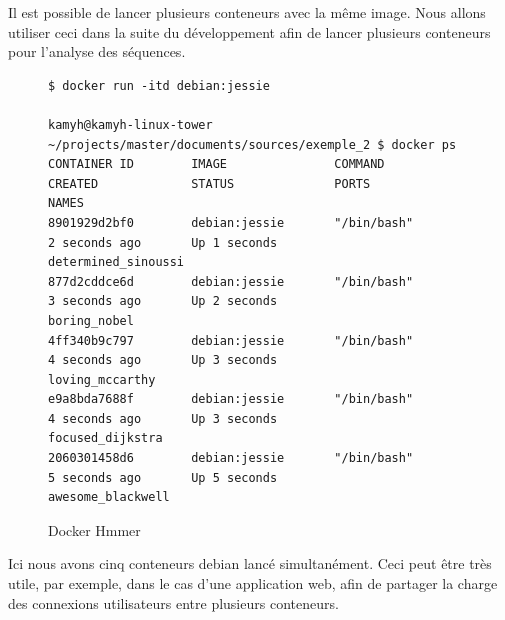 Il est possible de lancer plusieurs conteneurs avec la même image. Nous allons utiliser ceci dans la suite du développement afin de lancer plusieurs conteneurs pour l'analyse des séquences.

\begin{figure}[H] 
\centering 
\begin{lstlisting}[frame=single]
$ docker run -itd debian:jessie

kamyh@kamyh-linux-tower ~/projects/master/documents/sources/exemple_2 $ docker ps
CONTAINER ID        IMAGE               COMMAND             CREATED             STATUS              PORTS               NAMES
8901929d2bf0        debian:jessie       "/bin/bash"         2 seconds ago       Up 1 seconds                            determined_sinoussi
877d2cddce6d        debian:jessie       "/bin/bash"         3 seconds ago       Up 2 seconds                            boring_nobel
4ff340b9c797        debian:jessie       "/bin/bash"         4 seconds ago       Up 3 seconds                            loving_mccarthy
e9a8bda7688f        debian:jessie       "/bin/bash"         4 seconds ago       Up 3 seconds                            focused_dijkstra
2060301458d6        debian:jessie       "/bin/bash"         5 seconds ago       Up 5 seconds                            awesome_blackwell
\end{lstlisting}
\caption[Docker Hmmer]{Docker Hmmer}
\label{fig:dockerHmmer} 
\end{figure}

Ici nous avons cinq conteneurs debian lancé simultanément. Ceci peut être très utile, par exemple, dans le cas d'une application web, afin de partager la charge des connexions utilisateurs entre plusieurs conteneurs.
































